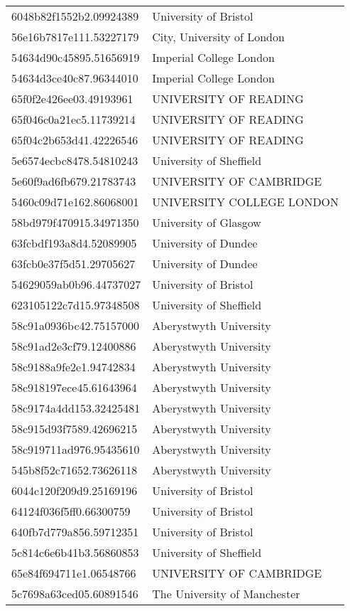 \begin{tabular}{ll}
6048b82f1552b2.09924389 & University of Bristol \\
56e16b7817e111.53227179 & City, University of London \\
54634d90c45895.51656919 & Imperial College London \\
54634d3ce40c87.96344010 & Imperial College London \\
65f0f2e426ee03.49193961 & UNIVERSITY OF READING \\
65f046c0a21ec5.11739214 & UNIVERSITY OF READING \\
65f04c2b653d41.42226546 & UNIVERSITY OF READING \\
5e6574ecbc8478.54810243 & University of Sheffield \\
5e60f9ad6fb679.21783743 & UNIVERSITY OF CAMBRIDGE \\
5460c09d71e162.86068001 & UNIVERSITY COLLEGE LONDON \\
58bd979f470915.34971350 & University of Glasgow \\
63fcbdf193a8d4.52089905 & University of Dundee \\
63fcb0e37f5d51.29705627 & University of Dundee \\
54629059ab0b96.44737027 & University of Bristol \\
623105122c7d15.97348508 & University of Sheffield \\
58c91a0936bc42.75157000 & Aberystwyth University \\
58c91ad2e3cf79.12400886 & Aberystwyth University \\
58c9188a9fe2e1.94742834 & Aberystwyth University \\
58c918197ece45.61643964 & Aberystwyth University \\
58c9174a4dd153.32425481 & Aberystwyth University \\
58c915d93f7589.42696215 & Aberystwyth University \\
58c919711ad976.95435610 & Aberystwyth University \\
545b8f52c71652.73626118 & Aberystwyth University \\
6044c120f209d9.25169196 & University of Bristol \\
64124f036f5ff0.66300759 & University of Bristol \\
640fb7d779a856.59712351 & University of Bristol \\
5c814c6e6b41b3.56860853 & University of Sheffield \\
65e84f694711e1.06548766 & UNIVERSITY OF CAMBRIDGE \\
5c7698a63ced05.60891546 & The University of Manchester \\

\end{tabular}
